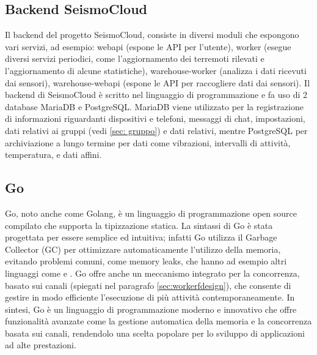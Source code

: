 \documentclass[main.tex]{subfiles}
\begin{document}
\subsection{Backend SeismoCloud}
Il backend del progetto SeismoCloud, consiste in diversi moduli che espongono vari servizi, ad esempio: webapi (espone le API per l'utente), worker (esegue diversi servizi periodici, come l'aggiornamento dei terremoti rilevati e l'aggiornamento di alcune statistiche), warehouse-worker (analizza i dati ricevuti dai sensori), warehouse-webapi (espone le API per raccogliere dati dai sensori).\newline
Il backend di SeismoCloud è scritto nel linguaggio di programmazione  e fa uso di 2 database MariaDB e PostgreSQL. MariaDB viene utilizzato per la registrazione di informazioni riguardanti dispositivi e telefoni, messaggi di chat, impostazioni, dati relativi ai gruppi (vedi \ref{sec: gruppo}) e dati relativi, mentre PostgreSQL per archiviazione a lungo termine per dati come vibrazioni, intervalli di attività, temperatura, e dati affini. 
\subsection{Go}
Go\cite{go}, noto anche come Golang, è un linguaggio di programmazione  open source compilato che supporta la tipizzazione statica. La sintassi di Go è stata progettata per essere semplice ed intuitiva; infatti Go utilizza il Garbage Collector (GC) per ottimizzare automaticamente l'utilizzo della memoria, evitando problemi comuni, come memory leaks, che hanno ad esempio altri linguaggi come  e . Go offre anche un meccanismo integrato per la concorrenza, basato sui canali (spiegati nel paragrafo \ref{sec:workerfdesign}), che consente di gestire in modo efficiente l'esecuzione di più attività contemporaneamente.\newline
In sintesi, Go è un linguaggio di programmazione moderno e innovativo che offre funzionalità avanzate come la gestione automatica della memoria e la concorrenza basata sui canali, rendendolo una scelta popolare per lo sviluppo di applicazioni ad alte prestazioni.
\end{document}
